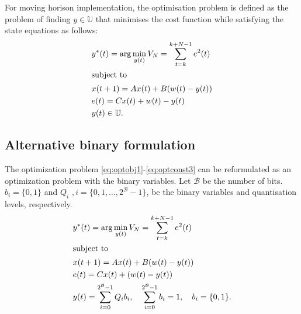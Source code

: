 \documentclass[a4paper]{article}
\begin{document}
For moving horison implementation, the optimisation problem is defined as the problem of finding $y \in \mathbb{U}$ that minimises  the cost function  while satisfying the state equations as follows:
\begin{align}
		& y^{\ast}(t) = \arg  \min_{y(t) }	V_{N}  = \sum_{t=k}^{k+N-1} e^{2}(t) \label{eq:optobj1}\\
		\intertext{subject to}
		&x(t+1) = A x(t) + B (w(t)-y(t))	\label{eq:optconst1}	\\
		&e(t) = Cx(t) + w(t)-y(t)	\label{eq:optconst2}	\\
		&y(t) \in \mathbb{U}. \label{eq:optconst3}
	\end{align}
\newpage
\subsection{Alternative binary formulation}
The optimization problem \eqref{eq:optobj1}-\eqref{eq:optconst3} can be reformulated as an optimization problem with the binary variables. Let $\mathcal{B}$ be the number of bits.  $b_{i} = \{0,1\}$ and $Q_{i}$ $, i = \{0, 1, \ldots, 2^{\mathcal{B}}-1\}$, be the binary variables and quantisation levels, respectively. 
\begin{align}
		& y^{\ast}(t) = \arg  \min_{y(t) }	V_{N}  = \sum_{t=k}^{k+N-1} e^{2}(t) \label{eq:optobj12}\\
		\intertext{subject to}
		&x(t+1) = A x(t) + B (w(t)-y(t))	\label{eq:optconst12}	\\
		&e(t) = Cx(t) + (w(t)-y(t))	\label{eq:optconst22}	\\
		&y(t) = \sum_{i = 0}^{2^{\mathcal{B}}-1} Q_{i}b_{i}, \quad \sum_{i = 0}^{2^{\mathcal{B}}-1}b_{i}  =1, \quad b_{i} = \{0,1\}. \label{eq:optconst32} 
	\end{align}

\end{document}
